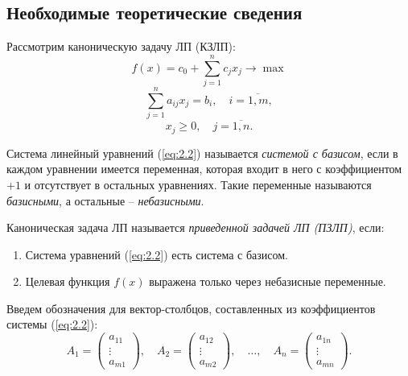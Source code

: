 \subsection{Необходимые теоретические сведения}

Рассмотрим каноническую задачу ЛП (КЗЛП):
\begin{equation}\label{eq:2.1}
  f(x)=c_0 + \sum^{n}_{j=1}c_jx_j\rightarrow \max
\end{equation}
\begin{equation}\label{eq:2.2}
  \sum_{j=1}^{n}a_{ij}x_j=b_i,\quad i=\overline{1,m}, 
\end{equation}
\begin{equation}\label{eq:2.3}
  x_j \geqslant 0,\quad j = \overline{1,n}.
\end{equation}

\begin{definition}
  Система линейный уравнений (\ref{eq:2.2}) называется \emph{системой с базисом}, если в каждом уравнении имеется переменная, которая входит в него с коэффициентом $ +1 $ и отсутствует в остальных уравнениях. Такие переменные называются \emph{базисными}, а остальные -- \emph{небазисными}.
\end{definition}

\begin{definition}
  Каноническая задача ЛП называется \emph{приведенной задачей ЛП (ПЗЛП)}, если:
    \begin{enumerate}
        \item Система уравнений (\ref{eq:2.2}) есть система с базисом.
        \item Целевая функция $ f(x) $ выражена только через небазисные переменные.
    \end{enumerate}
\end{definition}

Введем обозначения для вектор-столбцов, составленных из коэффициентов системы (\ref{eq:2.2}):
\[
    A_1 = \left(\begin{matrix}
        a_{11} \\ \vdots \\ a_{m1}
    \end{matrix}\right), \quad A_2 = \left(\begin{matrix}
        a_{12} \\ \vdots \\ a_{m2}
    \end{matrix}\right), \quad \ldots, \quad A_n = \left(\begin{matrix}
        a_{1n} \\ \vdots \\ a_{mn}
    \end{matrix}\right). 
\]

